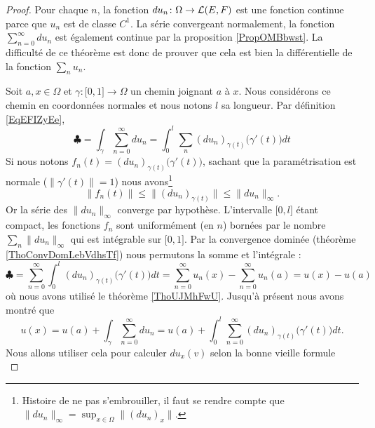 \begin{proof}
    Pour chaque \( n\), la fonction \( du_n\colon \Omega\to \mathcal{L}(E,F)\) est une fonction continue parce que \( u_n\) est de classe \( C^1\). La série convergeant normalement, la fonction \( \sum_{n=0}^{\infty}du_n\) est également continue par la proposition \ref{PropOMBbwst}. La difficulté de ce théorème est donc de prouver que cela est bien la différentielle de la fonction \( \sum_nu_n\).

    Soit \( a,x\in \Omega\) et \( \gamma\colon \mathopen[ 0 , 1 \mathclose]\to \Omega\) un chemin joignant \( a\) à \( x\). Nous considérons ce chemin en coordonnées normales et nous notons \( l\) sa longueur. Par définition \ref{EqEFIZyEe},
    \begin{equation}
        \clubsuit=\int_{\gamma}\sum_{n=0}^{\infty}du_n=\int_0^l\sum_n(du_n)_{\gamma(t)}\big( \gamma'(t) \big)dt
    \end{equation}
    Si nous notons \( f_n(t)=(du_n)_{\gamma(t)}\big( \gamma'(t) \big)\), sachant que la paramétrisation est normale (\( \| \gamma'(t) \|=1\)) nous avons\footnote{Histoire de ne pas s'embrouiller, il faut se rendre compte que \( \| du_n \|_{\infty}=\sup_{x\in \Omega}\| (du_n)_x \|\).}
    \begin{equation}
        \| f_n(t) \|\leq \|   (du_n)_{\gamma(t)}  \|\leq \| du_n \|_{\infty}.
    \end{equation}
    Or la série des \( \| du_n \|_{\infty}\) converge par hypothèse. L'intervalle \( \mathopen[ 0 , l \mathclose]\) étant compact, les fonctions \( f_n\) sont uniformément (en \( n\)) bornées par le nombre \( \sum_n\| du_n \|_{\infty}\) qui est intégrable sur \( \mathopen[ 0 , 1 \mathclose]\). Par la convergence dominée (théorème \ref{ThoConvDomLebVdhsTf}) nous permutons la somme et l'intégrale :
    \begin{equation}
        \clubsuit=\sum_{n=0}^{\infty}\int_0^l(du_n)_{\gamma(t)}\big( \gamma'(t) \big)dt=\sum_{n=0}^{\infty}u_n(x)-\sum_{n=0}^{\infty}u_n(a)=u(x)-u(a)
    \end{equation}
    où nous avons utilisé le théorème \ref{ThoUJMhFwU}. Jusqu'à présent nous avons montré que
    \begin{equation}
        u(x)=u(a)+\int_{\gamma}\sum_{n=0}^{\infty}du_n=u(a)+\int_0^l\sum_{n=0}^{\infty}(du_n)_{\gamma(t)}\big( \gamma'(t) \big)dt.
    \end{equation}
    Nous allons utiliser cela pour calculer \( du_x(v)\) selon la bonne vieille formule
    \begin{equation}

\end{equation}
\end{proof}
